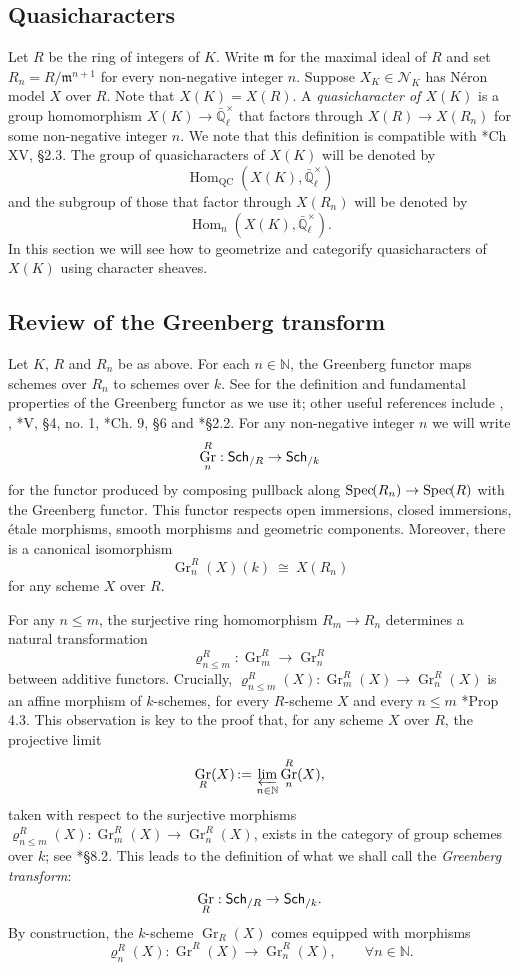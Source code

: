 \documentclass[10pt]{amsart}
\theoremstyle{plain}
\theoremstyle{definition}
\theoremstyle{remark}
\newcommand{\NN}{{\mathbb{N}}}
\newcommand{\EE}{\mathbb{\bar Q}_\ell}
\newcommand{\Fq}{k}
\newcommand{\EEx}{\EE^\times}
\newcommand{\m}{{\mathfrak{m}}}
\DeclareMathOperator{\Hom}{Hom}
\DeclareMathOperator{\Gr}{Gr}
\newcommand{\Spec}[1]{{\operatorname{Spec}\hskip-1pt( #1 )}}
\newcommand{\ceq}{{\, :=\, }}
\newcommand{\iso}{{\ \cong\ }}
\newcommand{\catname}[1]{\normalfont{\textsf{#1}}}
\newcommand{\Sch}[1]{{\catname{Sch}_{/#1}}}
\begin{document}
\subsection{Quasicharacters}\label{ssec:quasicharacters}

Let $R$ be the ring of integers of $K$.
Write $\m$ for the maximal ideal of $R$ and set $R_n = R/\m^{n+1}$ for every non-negative integer $n$.
Suppose $X_K \in \mathcal{N}_K$ has N\'eron model $X$ over $R$.
Note that $X(K) = X(R)$.
A \emph{quasicharacter of $X(K)$} is a group homomorphism $X(K) \to \EEx$ that factors through $X(R) \to X(R_n)$ for some non-negative integer $n$.
We note that this definition is compatible with \cite{cassels-frohlich:AlgebraicNumberTheory}*{Ch XV, \S 2.3}.
The group of quasicharacters of $X(K)$ will be denoted by 
\[
\Hom_\text{QC}(X(K),\EEx)
\]
 and the subgroup of those that factor through $X(R_n)$ will be denoted by 
 \[
 \Hom_n(X(K),\EEx).
\]
In this section we will see how to geometrize and categorify quasicharacters of $X(K)$ using character sheaves.

\subsection{Review of the Greenberg transform} \label{ssec:rev_Greenberg}

Let $K$, $R$ and $R_n$ be as above.
For each $n \in \NN$, the Greenberg functor maps schemes over $R_n$ to schemes over $\Fq$.
See \cite{bertrapelle-gonzales:Greenberg} for the definition and fundamental properties of the Greenberg functor as we use it; other useful references include
\cite{greenberg:61}, \cite{greenberg:63a},
\cite{demazure-gabriel:GroupesAlgebriques}*{V, \S 4, no. 1},
\cite{bosch-lutkebohmert-reynaud:NeronModels}*{Ch. 9, \S 6} and
\cite{nicaise-sebag:motivicSerre}*{\S 2.2}. %
%
For any non-negative integer $n$ we will write
\[
\Gr^R_n : \Sch{R} \to \Sch{\Fq}
\]
for the functor produced by composing pullback along $\Spec{R_n} \to \Spec{R}$ with the Greenberg functor. 
This functor respects open immersions, closed immersions, \'etale morphisms, smooth morphisms and geometric components.  Moreover, there is a canonical isomorphism
\[
\Gr^R_n(X)(\Fq) \iso X(R_n)
\]
for any scheme $X$ over $R$.

For any $n\leq m$,  the surjective ring homomorphism $R_{m} \to R_n$ determines a
natural transformation 
\[
\varrho^R_{n\leq m} : \Gr^R_{m} \to \Gr^R_n
\]
between additive functors.
Crucially, $\varrho^R_{n\leq m}(X): \Gr^R_{m}(X)\to \Gr^R_n(X)$ is an affine morphism of $\Fq$-schemes, for every $R$-scheme $X$ and every $n\leq m$ \cite{bertrapelle-gonzales:Greenberg}*{Prop 4.3}.
This observation is key to the proof that, for any scheme $X$ over $R$, the projective limit 
\[
\Gr_R(X) \ceq \varprojlim_{n\in \NN} \Gr^R_n(X),
\]
taken with respect to the surjective morphisms $\varrho^R_{n\leq m}(X) : \Gr^R_{m}(X) \to \Gr^R_n(X)$,
exists in the category of group schemes over $\Fq$;
see \cite{EGAIV3}*{\S 8.2}.
This leads to the definition of what we shall call the {\it Greenberg transform}:
\[
\Gr_R : \Sch{R} \to \Sch{\Fq}.
\]
By construction, the $\Fq$-scheme $\Gr_R(X)$ comes equipped with morphisms 
\[
\varrho^R_n(X) : \Gr^R(X) \to \Gr^R_n(X),\qquad \forall n\in \NN.
\]
\end{document}
